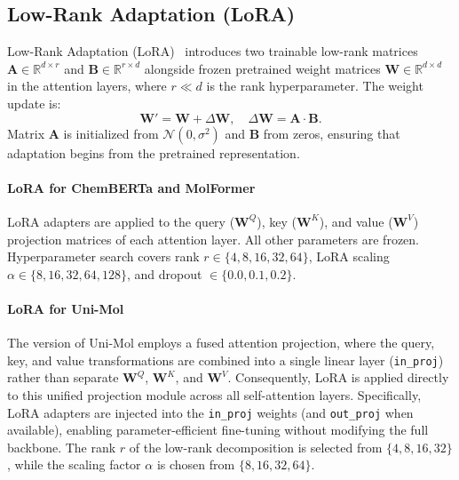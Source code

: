\documentclass[9pt,twocolumn,conference]{IEEEtran}
\begin{document}
\subsection{Low-Rank Adaptation (LoRA)}\label{sec:lora}
Low-Rank Adaptation (LoRA)~\cite{hu2021lora} introduces two trainable low-rank matrices $\mathbf{A} \in \mathbb{R}^{d \times r}$ and $\mathbf{B} \in \mathbb{R}^{r \times d}$ alongside frozen pretrained weight matrices $\mathbf{W} \in \mathbb{R}^{d \times d}$ in the attention layers, where $r \ll d$ is the rank hyperparameter. The weight update is: 
\begin{equation}
  \mathbf{W}' = \mathbf{W} + \Delta\mathbf{W}, \quad \Delta\mathbf{W} = \mathbf{A} \cdot \mathbf{B}.
\end{equation}
Matrix $\mathbf{A}$ is initialized from $\mathcal{N}(0, \sigma^2)$ and $\mathbf{B}$ from zeros, ensuring that adaptation begins from the pretrained representation.

\paragraph{LoRA for ChemBERTa and MolFormer}
LoRA adapters are applied to the query ($\mathbf{W}^Q$), key ($\mathbf{W}^K$), and value ($\mathbf{W}^V$) projection matrices of each attention layer. All other parameters are frozen. Hyperparameter search covers rank $r \in \{4, 8, 16, 32, 64\}$, LoRA scaling $\alpha \in \{8, 16, 32, 64, 128\}$, and dropout $\in \{0.0, 0.1, 0.2\}$.

\paragraph{LoRA for Uni-Mol} The version of Uni-Mol employs a fused attention projection, where the query, key, and value transformations are combined into a single linear layer (\texttt{in\_proj}) rather than separate $\mathbf{W}^Q$, $\mathbf{W}^K$, and $\mathbf{W}^V$. Consequently, LoRA is applied directly to this unified projection module across all self-attention layers.
Specifically, LoRA adapters are injected into the \texttt{in\_proj} weights (and \texttt{out\_proj} when available), enabling parameter-efficient fine-tuning without modifying the full backbone. The rank $r$ of the low-rank decomposition is selected from $\{4, 8, 16, 32\}$, while the scaling factor $\alpha$ is chosen from $\{8, 16, 32, 64\}$. 

\end{document}
